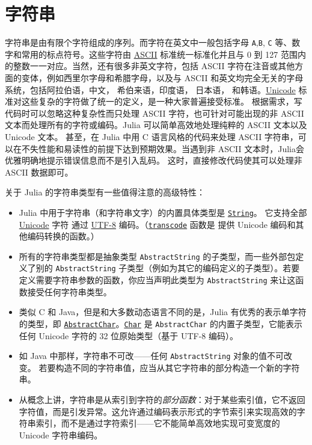 \chapter{字符串}



字符串是由有限个字符组成的序列。而字符在英文中一般包括字母 \texttt{A},\texttt{B}, \texttt{C} 等、数字和常用的标点符号。这些字符由 \href{https://en.wikipedia.org/wiki/ASCII}{ASCII} 标准统一标准化并且与 0 到 127 范围内的整数一一对应。当然，还有很多非英文字符，包括 ASCII 字符在注音或其他方面的变体，例如西里尔字母和希腊字母，以及与 ASCII 和英文均完全无关的字母系统，包括阿拉伯语，中文， 希伯来语，印度语， 日本语， 和韩语。\href{https://en.wikipedia.org/wiki/Unicode}{Unicode} 标准对这些复杂的字符做了统一的定义，是一种大家普遍接受标准。 根据需求，写代码时可以忽略这种复杂性而只处理 ASCII 字符，也可针对可能出现的非 ASCII 文本而处理所有的字符或编码。Julia 可以简单高效地处理纯粹的 ASCII 文本以及 Unicode 文本。 甚至，在 Julia 中用 C 语言风格的代码来处理 ASCII 字符串，可以在不失性能和易读性的前提下达到预期效果。当遇到非 ASCII 文本时，Julia会优雅明确地提示错误信息而不是引入乱码。 这时，直接修改代码使其可以处理非 ASCII 数据即可。



关于 Julia 的字符串类型有一些值得注意的高级特性：



\begin{itemize}
\item Julia 中用于字符串（和字符串文字）的内置具体类型是 \hyperlink{2825695355940841177}{\texttt{String}}。 它支持全部 \href{https://en.wikipedia.org/wiki/Unicode}{Unicode} 字符 通过 \href{https://en.wikipedia.org/wiki/UTF-8}{UTF-8} 编码。（\hyperlink{11147209877072452260}{\texttt{transcode}} 函数是 提供 Unicode 编码和其他编码转换的函数。）


\item 所有的字符串类型都是抽象类型 \texttt{AbstractString} 的子类型，而一些外部包定义了别的 \texttt{AbstractString} 子类型（例如为其它的编码定义的子类型）。若要定义需要字符串参数的函数，你应当声明此类型为 \texttt{AbstractString} 来让这函数接受任何字符串类型。


\item 类似 C 和 Java，但是和大多数动态语言不同的是，Julia 有优秀的表示单字符的类型，即 \hyperlink{17842511721012314372}{\texttt{AbstractChar}}。\hyperlink{3463806064296245385}{\texttt{Char}} 是 \texttt{AbstractChar} 的内置子类型，它能表示任何 Unicode 字符的 32 位原始类型（基于 UTF-8 编码）。


\item 如 Java 中那样，字符串不可改——任何 \texttt{AbstractString} 对象的值不可改变。 若要构造不同的字符串值，应当从其它字符串的部分构造一个新的字符串。


\item 从概念上讲，字符串是从索引到字符的\emph{部分函数}：对于某些索引值，它不返回字符值，而是引发异常。这允许通过编码表示形式的字节索引来实现高效的字符串索引，而不是通过字符索引——它不能简单高效地实现可变宽度的 Unicode 字符串编码。

\end{itemize}


